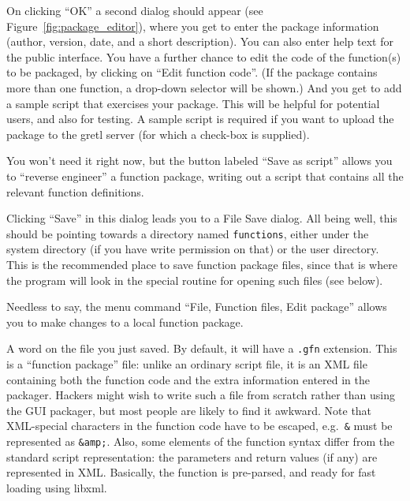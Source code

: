 On clicking ``OK'' a second dialog should appear (see
Figure~\ref{fig:package_editor}), where you get to enter the package
information (author, version, date, and a short description).  You can
also enter help text for the public interface.  You have a further
chance to edit the code of the function(s) to be packaged, by clicking
on ``Edit function code''.  (If the package contains more than one
function, a drop-down selector will be shown.)  And you get to add a
sample script that exercises your package.  This will be helpful for
potential users, and also for testing.  A sample script is required if
you want to upload the package to the gretl server (for which a
check-box is supplied).

You won't need it right now, but the button labeled ``Save as script''
allows you to ``reverse engineer'' a function package, writing out a
script that contains all the relevant function definitions.

Clicking ``Save'' in this dialog leads you to a File Save dialog.  All
being well, this should be pointing towards a directory named
\texttt{functions}, either under the  system directory (if
you have write permission on that) or the  user directory.
This is the recommended place to save function package files, since
that is where the program will look in the special routine for opening
such files (see below).

Needless to say, the menu command ``File, Function files, Edit package''
allows you to make changes to a local function package.

\vspace{6pt}

A word on the file you just saved.  By default, it will have a
\texttt{.gfn} extension.  This is a ``function package'' file: unlike
an ordinary  script file, it is an XML file containing both
the function code and the extra information entered in the packager.
Hackers might wish to write such a file from scratch rather than using
the GUI packager, but most people are likely to find it awkward.  Note
that XML-special characters in the function code have to be escaped,
e.g.\ \texttt{\&} must be represented as \texttt{\&amp;}.  Also, some
elements of the function syntax differ from the standard script
representation: the parameters and return values (if any) are
represented in XML.  Basically, the function is pre-parsed, and ready
for fast loading using \textsf{libxml}.

\vspace{6pt}

